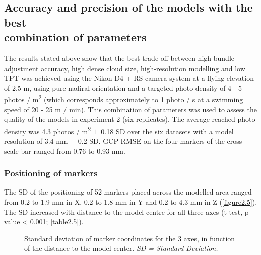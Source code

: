\subsection{Accuracy and precision of the models with the best\\ combination of parameters}\label{chapitre2_3.2}
The results stated above show that the best trade-off between high bundle adjustment accuracy, high dense cloud size, high-resolution modelling and low TPT was achieved using the Nikon D4 + RS camera system at a flying elevation of 2.5 m, using pure nadiral orientation and a targeted photo density of 4 - 5 photos / m\textsuperscript{2} (which corresponds approximately to 1 photo / s at a swimming speed of 20 - 25 m / min). This combination of parameters was used to assess the quality of the models in experiment 2 (six replicates). The average reached photo density was 4.3 photos / m\textsuperscript{2} $\pm$ 0.18 SD over the six datasets with a model resolution of 3.4 mm $\pm$ 0.2 SD. GCP RMSE on the four markers of the cross scale bar ranged from 0.76 to 0.93 mm.

\subsubsection{Positioning of markers}\label{chapitre2_3.2.1}
The SD of the positioning of 52 markers placed across the modelled area ranged from 0.2 to 1.9 mm in X, 0.2 to 1.8 mm in Y and 0.2 to 4.3 mm in Z (\autoref{figure2.5}). The SD increased with distance to the model centre for all three axes (t-test, p-value < 0.001; \autoref{table2.5}).

\begin{figure}[htbp]
	\caption[Standard deviation of marker coordinates for the 3 axes]{Standard deviation of marker coordinates for the 3 axes, in function of the distance to the model center. \textit{SD = Standard Deviation.}}
	\label{figure2.5}
\end{figure}



